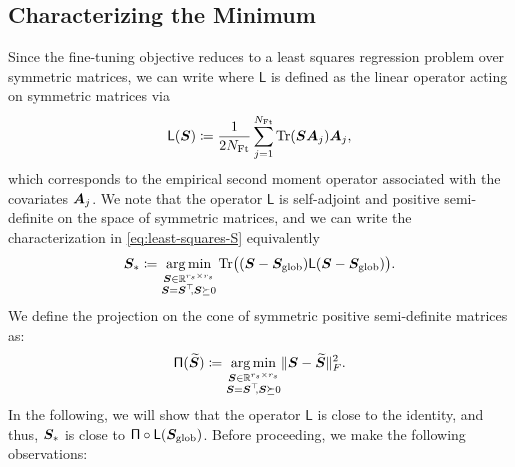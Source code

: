 \subsection{Characterizing the Minimum}
Since the fine-tuning objective reduces to a least squares regression problem over symmetric matrices, we can write   
where $\mathsf{L}$ is defined as the linear operator acting on symmetric matrices via
\begin{equation}
\mathsf{L}(\boldsymbol{S}) \coloneqq \frac{1}{2 N_{\mathrm{Ft}}} \sum_{j=1}^{N_{\mathrm{Ft}}} \text{Tr}(\boldsymbol{S} \boldsymbol{A}_j) \boldsymbol{A}_j,
\end{equation}
which corresponds to the empirical second moment operator associated with the covariates  $\boldsymbol{A}_j$. We note that the operator  $\mathsf{L}$ is self-adjoint and positive semi-definite on the space of symmetric matrices, and we can write the characterization in \eqref{eq:least-squares-S} equivalently
\begin{equation}
\boldsymbol{S}_* \coloneqq  \operatorname*{arg\,min}_{\substack{\boldsymbol{S} \in \mathbb{R}^{r_s \times r_s} \\ \boldsymbol{S} = \boldsymbol{S}^\top \!\!,  \boldsymbol{S} \succeq 0}}  \text{Tr} \big( (\boldsymbol{S} - \boldsymbol{S}_{\mathrm{glob}}) \mathsf{L}(\boldsymbol{S} - \boldsymbol{S}_{\mathrm{glob}}) \big). \label{eq:least-squares-S2}
\end{equation}
We define the projection on the cone of symmetric positive semi-definite matrices as:
\begin{equation}
\mathsf{\Pi}(\widetilde{\boldsymbol{S}})   \coloneqq  \operatorname*{arg\,min}_{\substack{\boldsymbol{S} \in \mathbb{R}^{r_s \times r_s} \\ \boldsymbol{S} = \boldsymbol{S}^\top \!\!,  \boldsymbol{S} \succeq 0}} \lVert \boldsymbol{S} - \widetilde{\boldsymbol{S}} \rVert_F^2  . \label{eq:least-squares-S2}
\end{equation}
In the following, we will show that the operator $\mathsf{L}$ is close to the identity, and thus,  $\boldsymbol{S}_*$ is close to  $\mathsf{\Pi} \circ \mathsf{L} (\boldsymbol{S}_{\mathrm{glob}})$. Before proceeding, we make the following observations: 
